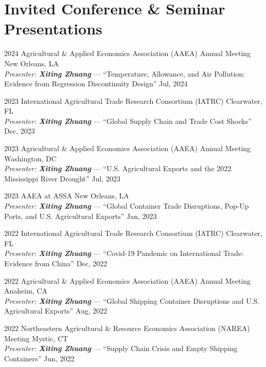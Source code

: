 \documentclass[10.5pt,letterpaper]{article}
\renewenvironment{itemize}{
	\begin{list}{}{
			\setlength{\leftmargin}{1.5em}
		}
	}{
	\end{list}
}
\begin{document}
\section*{\textbf{Invited Conference \& Seminar Presentations}}
\begin{itemize}
	\item[-] 2024 Agricultural \& Applied Economics Association (AAEA) Annual Meeting \hfill New Orleans, LA \\
	\textit{Presenter: \textbf{Xiting Zhuang}} — ``Temperature, Allowance, and Air Pollution: Evidence from Regression Discontinuity Design'' \hfill Jul, 2024
	
	\item[-] 2023 International Agricultural Trade Research Consortium (IATRC) \hfill Clearwater, FL \\
	\textit{Presenter: \textbf{Xiting Zhuang}} — ``Global Supply Chain and Trade Cost Shocks'' \hfill Dec, 2023
	
	\item[-] 2023 Agricultural \& Applied Economics Association (AAEA) Annual Meeting \hfill Washington, DC \\
	\textit{Presenter: \textbf{Xiting Zhuang}} — ``U.S. Agricultural Exports and the 2022 Mississippi River Drought'' \hfill Jul, 2023
	
	\item[-] 2023 AAEA at ASSA \hfill New Orleans, LA \\
	\textit{Presenter: \textbf{Xiting Zhuang}} — ``Global Container Trade Disruptions, Pop-Up Ports, and U.S. Agricultural Exports'' \hfill Jan, 2023
	
	\item[-] 2022 International Agricultural Trade Research Consortium (IATRC) \hfill Clearwater, FL \\
	\textit{Presenter: \textbf{Xiting Zhuang}} — ``Covid-19 Pandemic on International Trade: Evidence from China'' \hfill Dec, 2022
	
	\item[-] 2022 Agricultural \& Applied Economics Association (AAEA) Annual Meeting \hfill Anaheim, CA \\
	\textit{Presenter: \textbf{Xiting Zhuang}} — ``Global Shipping Container Disruptions and U.S. Agricultural Exports'' \hfill Aug, 2022
	
	\item[-] 2022 Northeastern Agricultural \& Resource Economics Association (NAREA) Meeting \hfill Mystic, CT \\
	\textit{Presenter: \textbf{Xiting Zhuang}} — ``Supply Chain Crisis and Empty Shipping Containers'' \hfill Jun, 2022
	

\end{itemize}
\end{document}
